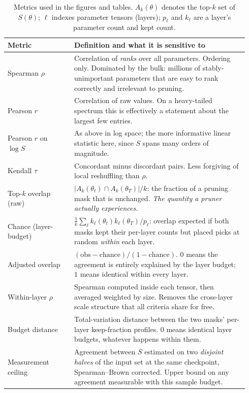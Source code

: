 \documentclass{article}
\begin{document}
\begin{table}[h]
  \caption{Metrics used in the figures and tables. $A_k(\theta)$ denotes the top-$k$ set of
  $S(\theta)$; $\ell$ indexes parameter tensors (layers); $p_\ell$ and $k_\ell$ are a
  layer's parameter count and kept count.}
  \label{tab:metrics}
  \centering
  \small
  \begin{tabular}{p{0.26\linewidth}p{0.68\linewidth}}
    \toprule
    Metric & Definition and what it is sensitive to \\
    \midrule
    Spearman $\rho$ & Correlation of \emph{ranks} over all parameters. Ordering only. Dominated by the bulk: millions of stably-unimportant parameters that are easy to rank correctly and irrelevant to pruning. \\
    Pearson $r$ & Correlation of raw values. On a heavy-tailed spectrum this is effectively a statement about the largest few entries. \\
    Pearson $r$ on $\log S$ & As above in log space; the more informative linear statistic here, since $S$ spans many orders of magnitude. \\
    Kendall $\tau$ & Concordant minus discordant pairs. Less forgiving of local reshuffling than $\rho$. \\
    \midrule
    Top-$k$ overlap (raw) & $|A_k(\theta_t)\cap A_k(\theta_T)|/k$: the fraction of a pruning mask that is unchanged. \emph{The quantity a pruner actually experiences.} \\
    Chance (layer-budget) & $\frac1k\sum_\ell k_\ell(\theta_t)k_\ell(\theta_T)/p_\ell$: overlap expected if both masks kept their per-layer counts but placed picks at random \emph{within} each layer. \\
    Adjusted overlap & $(\text{obs}-\text{chance})/(1-\text{chance})$. $0$ means the agreement is entirely explained by the layer budget; $1$ means identical within every layer. \\
    \midrule
    Within-layer $\rho$ & Spearman computed inside each tensor, then averaged weighted by size. Removes the cross-layer scale structure that all criteria share for free. \\
    Budget distance & Total-variation distance between the two masks' per-layer keep-fraction profiles. $0$ means identical layer budgets, whatever happens within them. \\
    \midrule
    Measurement ceiling & Agreement between $S$ estimated on two \emph{disjoint halves} of the input set at the same checkpoint, Spearman--Brown corrected. Upper bound on any agreement measurable with this sample budget. \\

\end{tabular}
\end{table}
\end{document}
